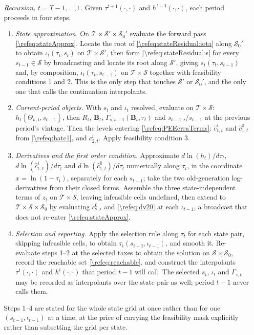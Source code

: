 \begin{alg}
\smallskip\noindent\emph{Recursion, $t = T-1,...,1$.} Given $\tau^{t+1}(\cdot,\cdot)$ and $h^{t+1}(\cdot,\cdot)$, each period proceeds in four steps.
\begin{enumerate}
    \item \emph{State approximation.} On $\mathcal{T}\times\mathcal{S}'\times\mathcal{S}_0'$ evaluate the forward pass \eqref{\refeq:stateApprox}. Locate the root of \eqref{\refeq:stateResidual:iota} along $\mathcal{S}_0'$ to obtain $\iota_t(\tau_t,s_t)$ on $\mathcal{T}\times\mathcal{S}'$, then form \eqref{\refeq:stateResidual:s} for every $s_{t-1}\in\mathcal{S}$ by broadcasting and locate its root along $\mathcal{S}'$, giving $s_t(\tau_t,s_{t-1})$ and, by composition, $\iota_t(\tau_t,s_{t-1})$ on $\mathcal{T}\times\mathcal{S}$ together with feasibility conditions 1 and 2. This is the only step that touches $\mathcal{S}'$ or $\mathcal{S}_0'$, and the only one that calls the continuation interpolants.
    \item \emph{Current-period objects.} With $s_t$ and $\iota_t$ resolved, evaluate on $\mathcal{T}\times\mathcal{S}$: $h_t\left(\Theta_{h,t},s_{t-1}\right)$, then $R_t$, $\bm{B}_t$, $\Gamma_{s,t-1}\left(\bm{B}_t,\tau_t\right)$ and $s_{t-1,i}/s_{t-1}$ at the previous period's vintage. Then the levels entering \eqref{\refeq:PEEcrraTerms}: $\hat{c}_{1,t}^i$ and $\hat{c}_{1,t}^0$ from \eqref{\refeq:hatc1}, and $c_{2,t}^i$. Apply feasibility condition 3.
    \item \emph{Derivatives and the first order condition.} Approximate $d\ln(h_t)/d\tau_t$, $d\ln(\hat{c}_{1,t}^i)/d\tau_t$ and $d\ln(\hat{c}_{1,t}^0)/d\tau_t$ numerically along $\tau_t$, in the coordinate $x = \ln(1-\tau_t)$, separately for each $s_{t-1}$; take the two old-generation log-derivatives from their closed forms. Assemble the three state-independent terms of $z_t$ on $\mathcal{T}\times\mathcal{S}$, leaving infeasible cells undefined, then extend to $\mathcal{T}\times\mathcal{S}\times\mathcal{S}_0$ by evaluating $c_{2,t}^0$ and \eqref{\refeq:dv20} at each $\iota_{t-1}$, a broadcast that does not re-enter \eqref{\refeq:stateApprox}.
    \item \emph{Selection and reporting.} Apply the selection rule along $\tau_t$ for each state pair, skipping infeasible cells, to obtain $\tau_t(s_{t-1},\iota_{t-1})$, and smooth it. Re-evaluate steps 1--2 at the selected taxes to obtain the solution on $\mathcal{S}\times\mathcal{S}_0$, record the reachable set \eqref{\refeq:reachable}, and construct the interpolants $\tau^t(\cdot,\cdot)$ and $h^t(\cdot,\cdot)$ that period $t-1$ will call. The selected $s_t$, $\iota_t$ and $\Gamma_{s,t}$ may be recorded as interpolants over the state pair as well; period $t-1$ never calls them.
\end{enumerate}
Steps 1--4 are stated for the whole state grid at once rather than for one $(s_{t-1},\iota_{t-1})$ at a time, at the price of carrying the feasibility mask explicitly rather than subsetting the grid per state.
\end{alg}
